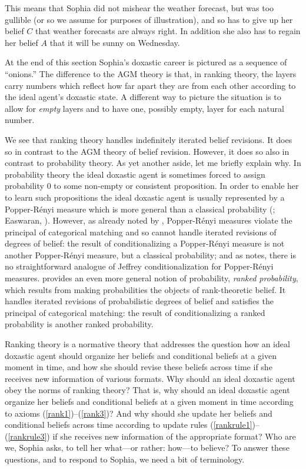 This means that Sophia did not mishear the weather forecast, but was too gullible (or so we assume for purposes of illustration), and so has to give up her belief $C$ that weather forecasts are always right. In addition she also has to regain her belief $A$ that it will be sunny on Wednesday.

At the end of this section Sophia's doxastic career is pictured as a sequence of ``onions.'' The difference to the AGM theory is that, in ranking theory, the layers carry numbers which reflect how far apart they are from each other according to the ideal agent's doxastic state. A different way to picture the situation is to allow for \emph{empty} layers and to have one, possibly empty, layer for each natural number.

We see that ranking theory handles indefinitely iterated belief revisions. It does so in contrast to the AGM theory of belief revision. However, it does so also in contrast to probability theory. As yet another aside, let me briefly explain why. In probability theory the ideal doxastic agent is sometimes forced to assign probability $0$ to some non-empty or consistent proposition. In order to enable her to learn such propositions the ideal doxastic agent is usually represented by a Popper-R\'{e}nyi measure which is more general than a classical probability (\citealp{p55, r55, s70, s86}; Easwaran, ). However, as already noted by \citet{h76a}, Popper-R\'{e}nyi measures violate the principal of categorical matching and so cannot handle iterated revisions of degrees of belief: the result of conditionalizing a Popper-R\'{e}nyi measure is not another Popper-R\'{e}nyi measure, but a classical probability; and as \citet{b95} notes, there is no straightforward analogue of Jeffrey conditionalization for Popper-R\'{e}nyi measures. \citet{s06a} provides an even more general notion of probability, \emph{ranked probability}, which results from making probabilities the objects of rank-theoretic belief. It handles iterated revisions of probabilistic degrees of belief and satisfies the principal of categorical matching: the result of conditionalizing a ranked probability is another ranked probability.

Ranking theory is a normative theory that addresses the question how an ideal doxastic agent should organize her beliefs and conditional beliefs at a given moment in time, and how she should revise these beliefs across time if she receives new information of various formats. Why should an ideal doxastic agent obey the norms of ranking theory? That is, why should an ideal doxastic agent organize her beliefs and conditional beliefs at a given moment in time according to axioms (\ref{rank1})--(\ref{rank3})? And why should she update her beliefs and conditional beliefs across time according to update rules (\ref{rankrule1})--(\ref{rankrule3}) if she receives new information of the appropriate format? Who are we, Sophia asks, to tell her what---or rather: how---to believe? To answer these questions, and to respond to Sophia, we need a bit of terminology.

